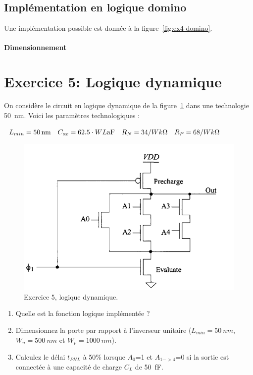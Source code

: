 \documentclass[frenchb,DIV=14]{scrartcl}
\begin{document}
\subsection*{Implémentation en logique domino}
Une implémentation possible est donnée à la figure~\ref{fig:ex4-domino}.

\paragraph{Dimensionnement}

\section*{Exercice 5: Logique dynamique}
On considère le circuit en logique dynamique de la figure~\ref{fig9-2} dans une technologie
\SI{50}{nm}. Voici les paramètres technologiques :
\begin{center} 
	$\begin{array}{l l l l}
		L_{min} = \SI{50}{nm} & C_{ox} = 62.5\cdot WL\text{aF} 
		& R_N= 34/W k\Omega
		& R_P= 68/W k\Omega \\ 
	\end{array}$
\end{center}

\begin{figure}[]
   \centering
   \includegraphics[width=14cm]{figures/fig9-2.png}
   \caption{Exercice 5, logique dynamique.}
   \label{fig9-2}
\end{figure}

\begin{enumerate}
	\item Quelle est la fonction logique implémentée ?
	\item Dimensionnez la porte par rapport à l'inverseur unitaire ($L_{min}=\SI{50}{nm}$,
	$W_n=\SI{500}{nm}$ et $W_p=\SI{1000}{nm}$).
	\item Calculez le délai $t_{PHL}$ à 50\% lorsque $A_0$=1 et $A_{1->4}$=0 si la sortie
	est connectée à une capacité de charge $C_L$ de \SI{50}{\femto\farad}.
\end{enumerate}
\end{document}
